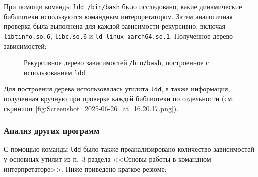 При помощи команды \texttt{ldd /bin/bash} было исследовано, какие динамические библиотеки используются командным интерпретатором. Затем аналогичная проверка была выполнена для каждой зависимости рекурсивно, включая \texttt{libtinfo.so.6}, \texttt{libc.so.6} и \texttt{ld-linux-aarch64.so.1}. Полученное дерево зависимостей:

\usetikzlibrary{trees}

\begin{figure}[H]
\centering
{}
\caption{Рекурсивное дерево зависимостей \texttt{/bin/bash}, построенное с использованием \texttt{ldd}}
\label{fig:bash-ldd-tree}
\end{figure}

Для построения дерева использовалась утилита \texttt{ldd}, а также информация, полученная вручную при проверке каждой библиотеки по отдельности (см. скриншот \ref{fig:Screenshot_2025-06-26_at_16.20.17.png}).


\subsubsection*{Анализ других программ}

С помощью команды \texttt{ldd} было также проанализировано количество зависимостей у основных утилит из п.~3 раздела <<Основы работы в командном интерпретаторе>>. Ниже приведено краткое резюме:

